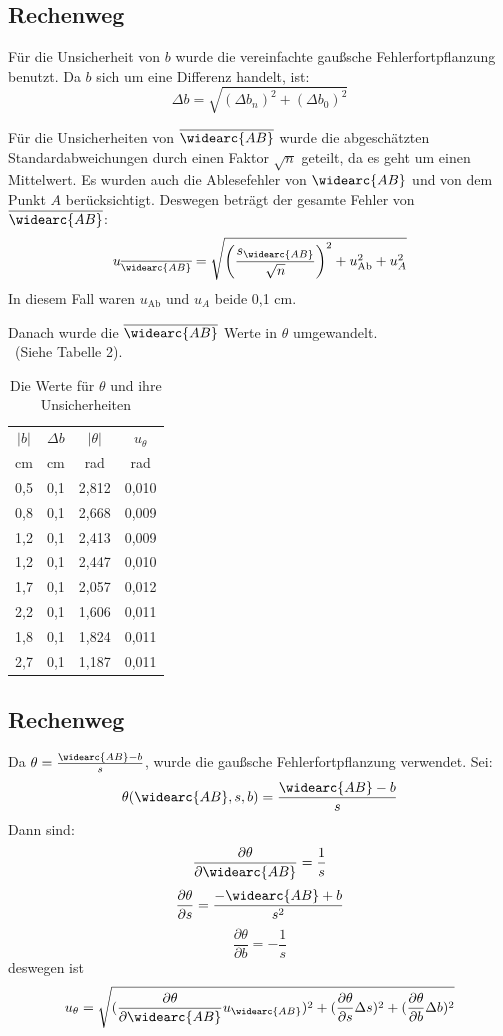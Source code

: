 \documentclass[11pt,a4paper]{article}
\begin{document}
\begin{tcolorbox}[colback=white]
\subsection{Rechenweg}
Für die Unsicherheit von $b$ wurde die vereinfachte gaußsche Fehlerfortpflanzung benutzt. Da $b$ sich um eine Differenz handelt, ist:
$$\Delta b = \sqrt{(\Delta b_n)^2 + (\Delta b_0)^2}$$

Für die Unsicherheiten von $\overline{\widearc{AB}}$ wurde die abgeschätzten Standardabweichungen durch einen Faktor $\sqrt{n}$ geteilt, da es geht um einen Mittelwert. Es wurden auch die Ablesefehler von $\widearc{AB}$ und von dem Punkt $A$ berücksichtigt. Deswegen beträgt der gesamte Fehler von $\overline{\widearc{AB}}$:
$$
u_{\overline{\widearc{AB}}} = \sqrt{\left(\frac{s_{\widearc{AB}}}{\sqrt{n}}\right)^2+u_\textrm{Ab}^2+u_A^2}
$$
In diesem Fall waren $u_\textrm{Ab}$ und $u_A$ beide 0,1 cm.
\end{tcolorbox}


Danach wurde die $\overline{\widearc{AB}}$ Werte in $\theta$ umgewandelt.
\\\
(Siehe Tabelle 2).

\newpage
\begin{table}[h]
	\centering
	\begin{tabular*}{0.50\textwidth}{@{\extracolsep{\fill}}cccc}
		\toprule
		$|b|$ & $\Delta b$ & $|\theta|$ & $u_\theta$  \\
		cm & cm & rad & rad \\
		\midrule
		0,5 & 0,1 & 2,812 & 0,010\\
		0,8 & 0,1  &2,668& 0,009\\
		1,2 & 0,1  &2,413& 0,009\\
		1,2 & 0,1 &2,447& 0,010\\
		1,7 & 0,1  &2,057& 0,012\\
		2,2 & 0,1  &1,606& 0,011\\
		1,8 & 0,1  &1,824& 0,011\\
		2,7 & 0,1  &1,187& 0,011\\
		\bottomrule
	\end{tabular*}
\caption{Die Werte für $\theta$ und ihre Unsicherheiten}
\end{table}

\begin{tcolorbox}[colback=white]
\subsection{Rechenweg}
Da $\theta = \frac{\widearc{AB}-b}{s}$, wurde die gaußsche Fehlerfortpflanzung verwendet.
Sei:
$$\theta(\widearc{AB},s,b) = \frac{\widearc{AB}-b}{s}$$
Dann sind:
$$\frac{\partial \theta}{\partial \widearc{AB}} = \frac{1}{s}$$
$$\frac{\partial \theta}{\partial s} = \frac{-\widearc{AB}+b}{s^2}$$
$$\frac{\partial \theta}{\partial b} = -\frac{1}{s}$$
 deswegen ist
$$u_\theta = \sqrt{(\frac{\partial \theta}{\partial \widearc{AB}}u_{\widearc{AB}})^2+(\frac{\partial \theta}{\partial s}\Delta s)^2+(\frac{\partial \theta}{\partial b}\Delta b)^2}$$
\end{tcolorbox}
\end{document}
